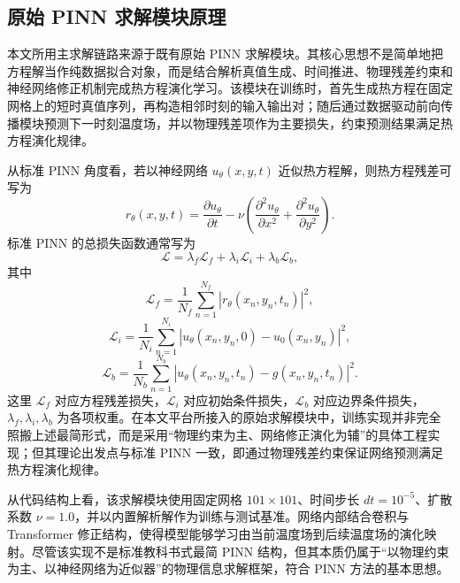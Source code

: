 \documentclass[UTF8,zihao=-4]{oucart}
\begin{document}
\subsection{原始 PINN 求解模块原理}

本文所用主求解链路来源于既有原始 PINN 求解模块。其核心思想不是简单地把方程解当作纯数据拟合对象，而是结合解析真值生成、时间推进、物理残差约束和神经网络修正机制完成热方程演化学习。该模块在训练时，首先生成热方程在固定网格上的短时真值序列，再构造相邻时刻的输入输出对；随后通过数据驱动前向传播模块预测下一时刻温度场，并以物理残差项作为主要损失，约束预测结果满足热方程演化规律。

从标准 PINN 角度看，若以神经网络 $u_\theta(x,y,t)$ 近似热方程解，则热方程残差可写为
\begin{equation}
r_\theta(x,y,t)=\frac{\partial u_\theta}{\partial t}-\nu\left(\frac{\partial^2 u_\theta}{\partial x^2}+\frac{\partial^2 u_\theta}{\partial y^2}\right).
\end{equation}
标准 PINN 的总损失函数通常写为
\begin{equation}
\mathcal{L}=\lambda_f\mathcal{L}_f+\lambda_i\mathcal{L}_i+\lambda_b\mathcal{L}_b,
\end{equation}
其中
\begin{equation}
\mathcal{L}_f=\frac{1}{N_f}\sum_{n=1}^{N_f}\left|r_\theta(x_n,y_n,t_n)\right|^2,
\end{equation}
\begin{equation}
\mathcal{L}_i=\frac{1}{N_i}\sum_{n=1}^{N_i}\left|u_\theta(x_n,y_n,0)-u_0(x_n,y_n)\right|^2,
\end{equation}
\begin{equation}
\mathcal{L}_b=\frac{1}{N_b}\sum_{n=1}^{N_b}\left|u_\theta(x_n,y_n,t_n)-g(x_n,y_n,t_n)\right|^2.
\end{equation}
这里 $\mathcal{L}_f$ 对应方程残差损失，$\mathcal{L}_i$ 对应初始条件损失，$\mathcal{L}_b$ 对应边界条件损失，$\lambda_f,\lambda_i,\lambda_b$ 为各项权重。在本文平台所接入的原始求解模块中，训练实现并非完全照搬上述最简形式，而是采用“物理约束为主、网络修正演化为辅”的具体工程实现；但其理论出发点与标准 PINN 一致，即通过物理残差约束保证网络预测满足热方程演化规律。

从代码结构上看，该求解模块使用固定网格 $101\times101$、时间步长 $dt=10^{-5}$、扩散系数 $\nu=1.0$，并以内置解析解作为训练与测试基准。网络内部结合卷积与 Transformer 修正结构，使得模型能够学习由当前温度场到后续温度场的演化映射。尽管该实现不是标准教科书式最简 PINN 结构，但其本质仍属于“以物理约束为主、以神经网络为近似器”的物理信息求解框架，符合 PINN 方法的基本思想\cite{raissi2019,karniadakis2021}。
\end{document}
